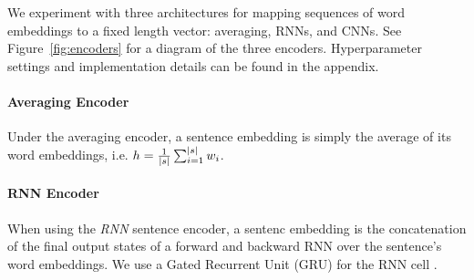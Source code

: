

We experiment with three architectures for mapping sequences
of word embeddings to a fixed length vector: averaging, RNNs, and CNNs.
See Figure~\ref{fig:encoders} for a diagram of the three encoders.
Hyperparameter settings and implementation details can be found 
in the appendix.

\paragraph{Averaging Encoder} Under the averaging encoder, a sentence embedding
\sentEmb is simply the average of its word embeddings, i.e. $\sentEmb = \frac{1}{\sentSize} \sum_{i=1}^{\sentSize} \wordEmb[i]$.


%

\paragraph{RNN Encoder} When using  the \textit{RNN} sentence encoder,
a sentenc embedding is the 
concatenation 
of the
final output states of a forward and backward RNN over the sentence's word
embeddings. We use a Gated Recurrent Unit (GRU)  
for the RNN cell \cite{chung2014empirical}.

